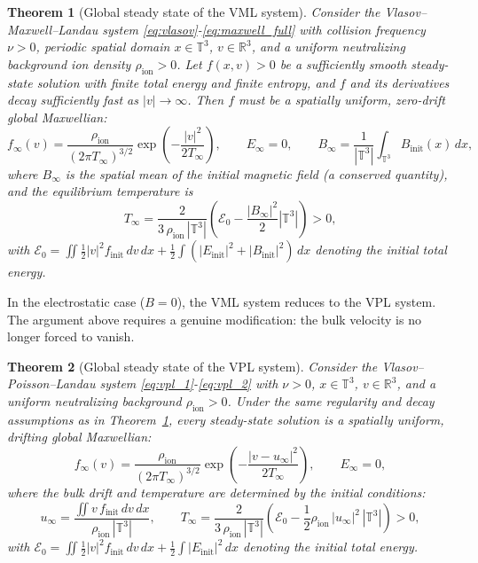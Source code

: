 \documentclass[]{article}
\newcommand{\R}{\mathbb{R}}
\numberwithin{equation}{section}
\newtheorem{theorem}{Theorem}[section]
\begin{document}
\begin{theorem}[Global steady state of the VML system]
\label{thm:equilibrium}
Consider the Vlasov--Maxwell--Landau system \eqref{eq:vlasov}-\eqref{eq:maxwell_full} with collision frequency $\nu > 0$, periodic spatial domain $x \in \mathbb{T}^{3}$, $v \in \R^{3}$, and a uniform neutralizing background ion density $\rho_{\mathrm{ion}} > 0$.  Let $f(x,v) > 0$ be a sufficiently smooth steady-state solution with finite total energy and finite entropy, and $f$ and its derivatives decay sufficiently fast as $|v| \to \infty$.  Then $f$ must be a spatially uniform, zero-drift global Maxwellian:
\begin{equation}
\label{eq:equilibrium}
f_\infty(v) = \frac{\rho_{\mathrm{ion}}}{(2\pi T_\infty)^{3/2}} \exp\!\left(-\frac{|v|^2}{2T_\infty}\right), \qquad E_\infty = 0, \qquad B_\infty = \frac{1}{|\mathbb{T}^3|}\int_{\mathbb{T}^3} B_{\mathrm{init}}(x) \, dx,
\end{equation}
where $B_\infty$ is the spatial mean of the initial magnetic field (a conserved quantity), and the equilibrium temperature is
\begin{equation}
\label{eq:T_infty_statement}
T_\infty = \frac{2}{3\, \rho_{\mathrm{ion}} \, |\mathbb{T}^3|} \left(\mathcal{E}_0 - \frac{|B_\infty|^2}{2} |\mathbb{T}^3|\right) > 0,
\end{equation}
with $\mathcal{E}_0 = \iint \frac{1}{2}|v|^2 f_{\mathrm{init}} \, dv \, dx + \frac{1}{2}\int (|E_{\mathrm{init}}|^2 + |B_{\mathrm{init}}|^2) \, dx$ denoting the initial total energy.
\end{theorem}

In the electrostatic case ($B = 0$), the VML system reduces to the VPL system. The argument above requires a genuine modification: the bulk velocity is no longer forced to vanish.

\begin{theorem}[Global steady state of the VPL system]
\label{thm:equilibrium_vpl}
Consider the Vlasov--Poisson--Landau system \eqref{eq:vpl_1}-\eqref{eq:vpl_2} with 
$\nu > 0$, $x \in \mathbb{T}^3$, $v \in \R^3$, and a uniform neutralizing background $\rho_{\mathrm{ion}} > 0$.  Under the same regularity and decay assumptions as in Theorem~\ref{thm:equilibrium}, every steady-state solution is a spatially uniform, drifting global Maxwellian:
\begin{equation}
\label{eq:equilibrium_vpl}
f_\infty(v) = \frac{\rho_{\mathrm{ion}}}{(2\pi T_\infty)^{3/2}} \exp\!\left(-\frac{|v - u_\infty|^2}{2T_\infty}\right), \qquad E_\infty = 0,
\end{equation}
where the bulk drift and temperature are determined by the initial conditions:
\begin{equation}
\label{eq:u_T_vpl_statement}
u_\infty = \frac{\iint v \, f_{\mathrm{init}} \, dv \, dx}{\rho_{\mathrm{ion}} \, |\mathbb{T}^3|}, \qquad T_\infty = \frac{2}{3\, \rho_{\mathrm{ion}} \, |\mathbb{T}^3|}\!\left(\mathcal{E}_0 - \frac{1}{2}\rho_{\mathrm{ion}} \, |u_\infty|^2 \, |\mathbb{T}^3|\right) > 0,
\end{equation}
with $\mathcal{E}_0 = \iint \frac{1}{2}|v|^2 f_{\mathrm{init}} \, dv \, dx + \frac{1}{2}\int |E_{\mathrm{init}}|^2 \, dx$ denoting the initial total energy.
\end{theorem}
\end{document}
